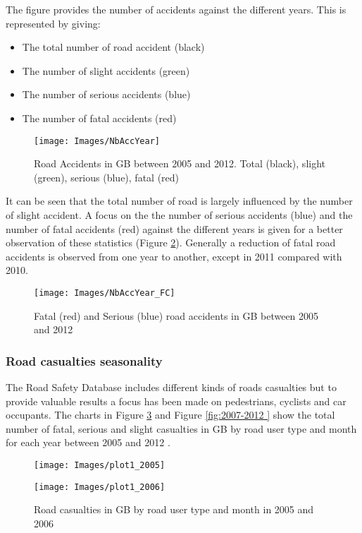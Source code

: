 \documentclass{article}
\begin{document}
The figure provides the number of accidents against the different years. This is represented by giving:

\begin{itemize}
\item The total number of road accident (black)
\item The number of slight accidents (green)
\item The number of serious accidents (blue)
\item The number of fatal accidents (red)
\end{itemize}


\begin{figure}[!h]
  \centering
  \texttt{[image: Images/NbAccYear]}
  \caption{Road Accidents in GB between 2005 and 2012. Total (black), slight (green), serious (blue), fatal (red)}
  \label{fig:NbAccYear}
\end{figure}

It can be seen that the total number of road is largely influenced by the number of slight accident. A focus on the the number of serious accidents (blue) and the number of fatal accidents (red) against the different years is given for a better observation of these statistics (Figure \ref{fig:NbAccYear_FC}). Generally a reduction of fatal road accidents is observed from one year to another, except in 2011 compared with 2010. 


\begin{figure}[!h]
\vspace{-2cm}
  \centering
  \texttt{[image: Images/NbAccYear\_FC]}
  \caption{Fatal (red) and Serious (blue) road accidents in GB between 2005 and 2012}
  \label{fig:NbAccYear_FC}
  
\end{figure} 



\subsubsection*{Road casualties seasonality}

The Road Safety Database includes different kinds of roads casualties but to provide valuable results a focus has been made on pedestrians, cyclists and car occupants. The charts in Figure \ref{fig:2005-2006 } and Figure \ref{fig:2007-2012 } show the total number of fatal, serious and slight casualties in GB by road user type and month for each year between 2005 and 2012 .

\begin{figure}[H]
\begin{minipage}[H]{.46\linewidth}
  \centering
    \texttt{[image: Images/plot1\_2005]}
\end{minipage}
\hspace{1cm}
\begin{minipage}[H]{0.46\linewidth}
  \centering
     \texttt{[image: Images/plot1\_2006]}
\end{minipage}
\caption{Road casualties in GB by road user type and month in 2005 and 2006 }  
 \label{fig:2005-2006 }
 \end{figure}
\end{document}
